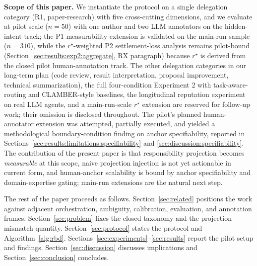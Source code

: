 
\textbf{Scope of this paper.} We instantiate the protocol on a single delegation category (R1, paper-research) with five cross-cutting dimensions, and we evaluate at pilot scale ($n = 50$) with one author and two LLM annotators on the hidden-intent track; the P1 measurability extension is validated on the main-run sample ($n = 310$), while the $r^\star$-weighted P2 settlement-loss analysis remains pilot-bound (Section~\ref{sec:results:exp2:aggregate}, RX paragraph) because $r^\star$ is derived from the closed pilot human-annotation track. The other delegation categories in our long-term plan (code review, result interpretation, proposal improvement, technical summarization), the full four-condition Experiment 2 with task-aware-routing and CLAMBER-style baselines, the longitudinal reputation experiment on real LLM agents, and a main-run-scale $r^\star$ extension are reserved for follow-up work; their omission is disclosed throughout. The pilot's planned human-annotator extension was attempted, partially executed, and yielded a methodological boundary-condition finding on anchor specifiability, reported in Sections~\ref{sec:results:limitations:specifiability} and \ref{sec:discussion:specifiability}. The contribution of the present paper is that responsibility projection becomes \emph{measurable} at this scope, naive projection injection is not yet actionable in current form, and human-anchor scalability is bound by anchor specifiability and domain-expertise gating; main-run extensions are the natural next step.

The rest of the paper proceeds as follows. Section~\ref{sec:related} positions the work against adjacent orchestration, ambiguity, calibration, evaluation, and annotation frames. Section~\ref{sec:problem} fixes the closed taxonomy and the projection-mismatch quantity. Section~\ref{sec:protocol} states the protocol and Algorithm~\ref{alg:rbd}. Sections~\ref{sec:experiments}--\ref{sec:results} report the pilot setup and findings. Section~\ref{sec:discussion} discusses implications and Section~\ref{sec:conclusion} concludes.
